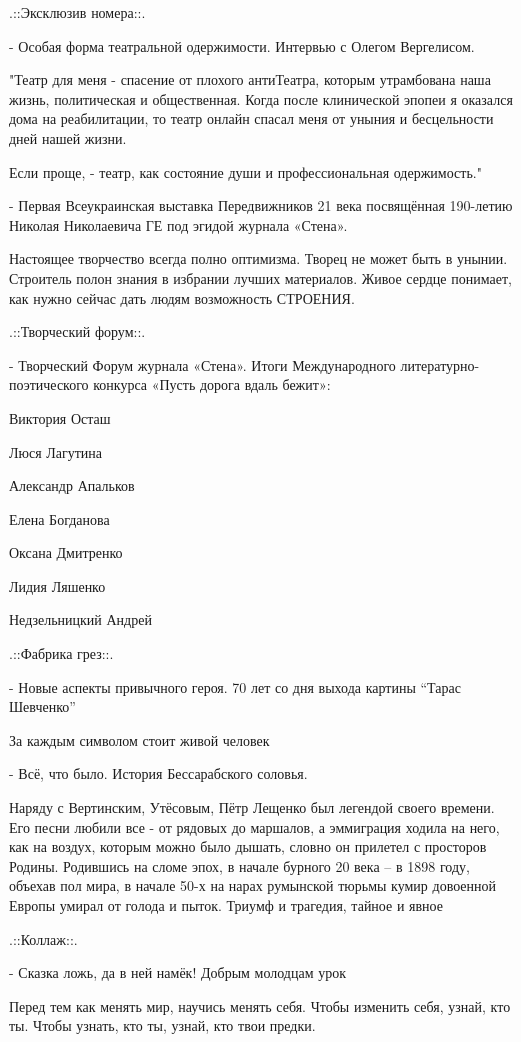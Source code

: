 .::Эксклюзив номера::.

- Особая форма театральной одержимости. Интервью с Олегом Вергелисом.

"Театр для меня - спасение от плохого антиТеатра, которым утрамбована наша
жизнь, политическая и общественная. Когда после клинической эпопеи я оказался
дома на реабилитации, то театр онлайн спасал меня от уныния и бесцельности дней
нашей жизни.

Если проще, - театр, как состояние души и профессиональная одержимость."

- Первая Всеукраинская выставка Передвижников 21 века посвящённая 190-летию
Николая Николаевича ГЕ под эгидой журнала «Стена».

Настоящее творчество всегда полно оптимизма. Творец не может быть в унынии.
Строитель полон знания в избрании лучших материалов. Живое сердце понимает, как
нужно сейчас дать людям возможность СТРОЕНИЯ.

.::Творческий  форум::.

- Творческий Форум журнала «Стена».  Итоги Международного
литературно-поэтического конкурса «Пусть дорога вдаль бежит»:

Виктория Осташ

Люся Лагутина

Александр Апальков

Елена Богданова

Оксана Дмитренко

Лидия Ляшенко

Недзельницкий Андрей

.::Фабрика грез::.

- Новые аспекты привычного героя. 70 лет со дня выхода картины “Тарас Шевченко” 

За каждым символом стоит живой человек

- Всё, что было. История Бессарабского соловья.

Наряду с Вертинским, Утёсовым, Пётр Лещенко был легендой своего времени.  Его
песни любили все - от рядовых до маршалов, а эммиграция ходила на него, как на
воздух, которым можно было дышать, словно он прилетел с просторов Родины.
Родившись на сломе эпох, в начале бурного 20 века – в 1898 году, объехав пол
мира, в начале 50-х на нарах румынской тюрьмы кумир довоенной Европы умирал от
голода и пыток. Триумф и трагедия, тайное и явное

.::Коллаж::.

- Сказка ложь, да в ней намёк! Добрым молодцам урок

Перед тем как менять мир, научись менять себя. Чтобы изменить себя, узнай, кто
ты. Чтобы узнать, кто ты, узнай, кто твои предки.

